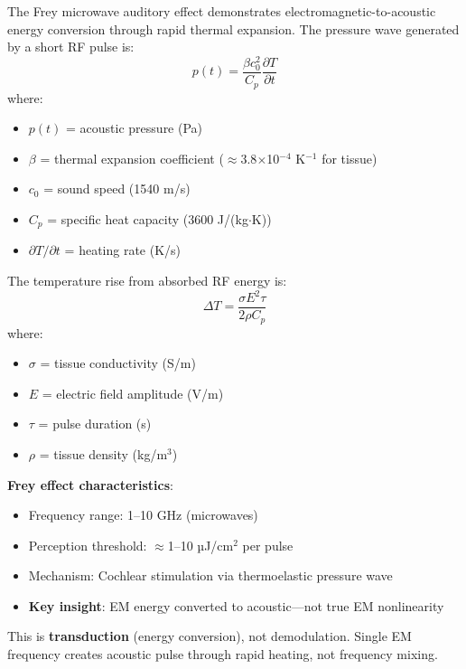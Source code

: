 The Frey microwave auditory effect demonstrates electromagnetic-to-acoustic energy conversion through rapid thermal expansion. The pressure wave generated by a short RF pulse is:
\begin{equation}
\label{eq:thermoelastic-pressure}
p(t) = \frac{\beta c_0^2}{C_p} \frac{\partial T}{\partial t}
\end{equation}
where:
\begin{itemize}
\item $p(t)$ = acoustic pressure (Pa)
\item $\beta$ = thermal expansion coefficient ($\approx$3.8$\times$10$^{-4}$ K$^{-1}$ for tissue)
\item $c_0$ = sound speed (1540 m/s)
\item $C_p$ = specific heat capacity (3600 J/(kg$\cdot$K))
\item $\partial T/\partial t$ = heating rate (K/s)
\end{itemize}

The temperature rise from absorbed RF energy is:
\begin{equation}
\label{eq:temperature-rise}
\Delta T = \frac{\sigma E^2 \tau}{2\rho C_p}
\end{equation}
where:
\begin{itemize}
\item $\sigma$ = tissue conductivity (S/m)
\item $E$ = electric field amplitude (V/m)
\item $\tau$ = pulse duration (s)
\item $\rho$ = tissue density (kg/m$^3$)
\end{itemize}

\textbf{Frey effect characteristics}:
\begin{itemize}
\item Frequency range: 1--10 GHz (microwaves)
\item Perception threshold: $\approx$1--10 µJ/cm$^2$ per pulse
\item Mechanism: Cochlear stimulation via thermoelastic pressure wave
\item \textbf{Key insight}: EM energy converted to acoustic---not true EM nonlinearity
\end{itemize}

\begin{warningbox}
This is \textbf{transduction} (energy conversion), not demodulation. Single EM frequency creates acoustic pulse through rapid heating, not frequency mixing.
\end{warningbox}

